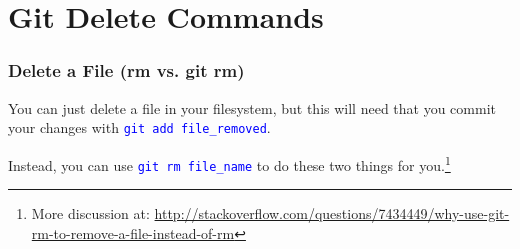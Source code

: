 
\section[Deleting]{Git Delete Commands}

\begin{frame}
\frametitle{\large Delete a File (rm vs. git rm)}
You can just delete a file in your filesystem, but this will need that you commit your changes with \textcolor{blue}{\texttt{git add file\_removed}}.

Instead, you can use \textcolor{blue}{\texttt{git rm file\_name}} to do these two things for you.\footnote{More discussion at: \url{http://stackoverflow.com/questions/7434449/why-use-git-rm-to-remove-a-file-instead-of-rm}}
\end{frame}